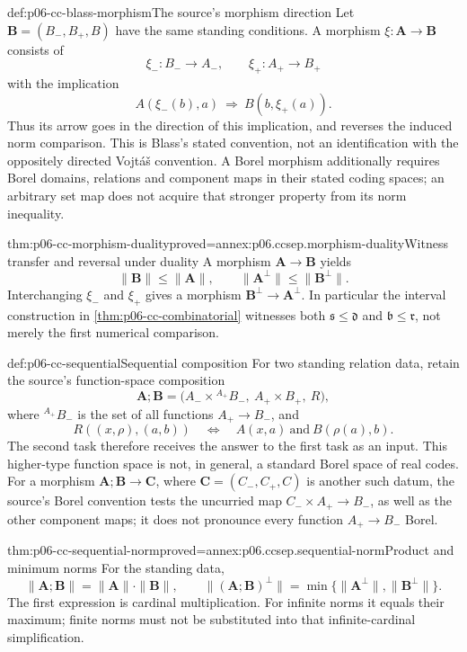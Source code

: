 \begin{hbdefinition}{def:p06-cc-blass-morphism}{The source's morphism direction}
Let \(\mathbf B=(B_-,B_+,B)\) have the same standing conditions.
A morphism \(\xi:\mathbf A\longrightarrow\mathbf B\) consists of
\[
 \xi_-:B_-\longrightarrow A_-,\qquad
 \xi_+:A_+\longrightarrow B_+
\]
with the implication
\[
 A(\xi_-(b),a)\ \Longrightarrow\ B(b,\xi_+(a)).
\]
Thus its arrow goes in the direction of this implication, and reverses
the induced norm comparison. This is Blass's stated convention, not
an identification with the oppositely directed Vojt\'a\v{s} convention.
A Borel morphism additionally requires Borel domains, relations and
component maps in their stated coding spaces; an arbitrary set map
does not acquire that stronger property from its norm inequality.
\end{hbdefinition}

\begin{hbtheorem}{thm:p06-cc-morphism-duality}{proved=annex:p06.ccsep.morphism-duality}{Witness transfer and reversal under duality}
A morphism \(\mathbf A\to\mathbf B\) yields
\[
 \|\mathbf B\|\leq\|\mathbf A\|,\qquad \|\mathbf A^\perp\|\leq\|\mathbf B^\perp\|.
\]
Interchanging \(\xi_-\) and \(\xi_+\) gives a morphism
\(\mathbf B^\perp\to \mathbf A^\perp\). In particular the interval construction
in \cref{thm:p06-cc-combinatorial} witnesses both
\(\mathfrak s\leq\mathfrak d\) and \(\mathfrak b\leq\mathfrak r\),
not merely the first numerical comparison.
\end{hbtheorem}

\begin{hbdefinition}{def:p06-cc-sequential}{Sequential composition}
For two standing relation data, retain the source's function-space
composition
\[
 \mathbf A;\mathbf B=\bigl(A_-\times{}^{A_+}B_-,\ A_+\times B_+,\ R\bigr),
\]
where \({}^{A_+}B_-\) is the set of all functions \(A_+\to B_-\), and
\[
 R((x,\rho),(a,b))\quad\Longleftrightarrow\quad
       A(x,a)\ \text{and}\ B(\rho(a),b).
\]
The second task therefore receives the answer to the first task as an
input. This higher-type function space is not, in general, a standard
Borel space of real codes. For a morphism \(\mathbf A;\mathbf B\to\mathbf C\),
where \(\mathbf C=(C_-,C_+,C)\) is another such datum, the source's
Borel convention tests the uncurried map \(C_-\times A_+\to B_-\),
as well as the other component maps; it does not pronounce every
function \(A_+\to B_-\) Borel.
\end{hbdefinition}

\begin{hbtheorem}{thm:p06-cc-sequential-norm}{proved=annex:p06.ccsep.sequential-norm}{Product and minimum norms}
For the standing data,
\[
 \|\mathbf A;\mathbf B\|=\|\mathbf A\|\cdot\|\mathbf B\|,\qquad
 \|(\mathbf A;\mathbf B)^\perp\|=\min\{\|\mathbf A^\perp\|,\|\mathbf B^\perp\|\}.
\]
The first expression is cardinal multiplication. For infinite norms it
equals their maximum; finite norms must not be substituted into that
infinite-cardinal simplification.
\end{hbtheorem}

